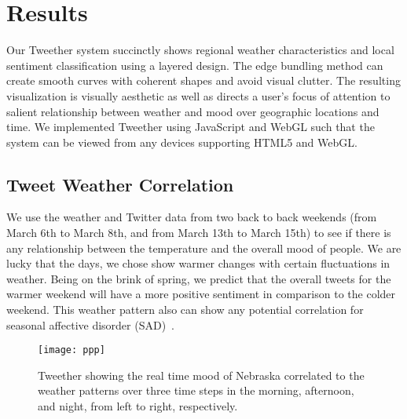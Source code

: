 \chapter{Results}

Our Tweether system succinctly shows regional weather characteristics and local sentiment classification using a layered design. The edge bundling method can create smooth curves with coherent shapes and avoid visual clutter. The resulting visualization is visually aesthetic as well as directs a user's focus of attention to salient relationship between weather and mood over geographic locations and time. We implemented Tweether using JavaScript and WebGL such that the system can be viewed from any devices supporting HTML5 and WebGL.


%


\section{Tweet Weather Correlation}

We use the weather and Twitter data from two back to back weekends (from March 6th to March 8th, and from March 13th to March 15th) to see if there is any relationship between the temperature and the overall mood of people. We are lucky that the days, we chose show warmer changes with certain fluctuations in weather. Being on the brink of spring, we predict that the overall tweets for the warmer weekend will have a more positive sentiment in comparison to the colder weekend. This weather pattern also can show any potential correlation for seasonal affective disorder (SAD)~\cite{denissen2008effects}.


\begin{figure}[t]
 \centering
 \texttt{[image: ppp]}
 \caption{Tweether showing the real time mood of Nebraska correlated to the weather patterns over three time steps in the morning, afternoon, and night, from left to right, respectively.}
 \label{fig:teaser}
\end{figure}


